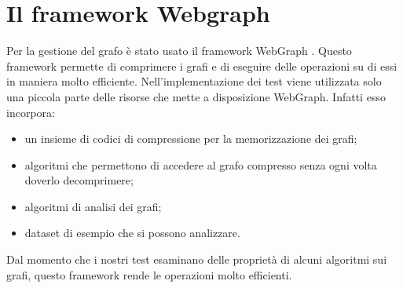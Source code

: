 \section{Il framework Webgraph}
Per la gestione del grafo è stato usato il framework WebGraph \cite{Boldi03thewebgraph}. Questo framework permette di comprimere i grafi e di eseguire delle operazioni su di essi in maniera molto efficiente. Nell'implementazione dei test viene utilizzata solo una piccola parte delle risorse che mette a disposizione WebGraph. Infatti esso incorpora:
\begin{itemize}
 \item un insieme di codici di compressione per la memorizzazione dei grafi;
 \item algoritmi che permettono di accedere al grafo compresso senza ogni volta doverlo decomprimere;
 \item algoritmi di analisi dei grafi;
 \item dataset di esempio che si possono analizzare.
\end{itemize}
Dal momento che i nostri test esaminano delle proprietà di alcuni algoritmi sui grafi, questo framework rende le operazioni molto efficienti.

